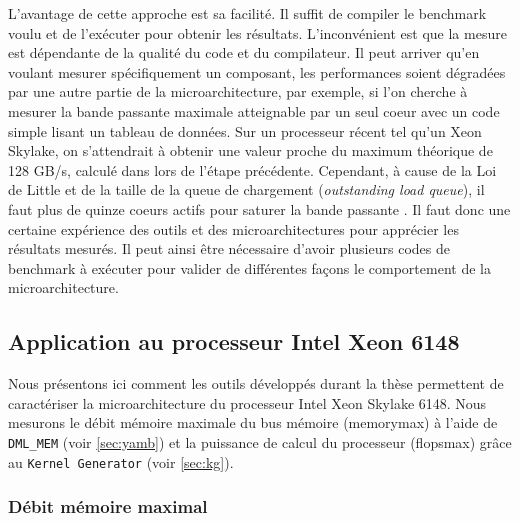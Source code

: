         L'avantage de cette approche est sa facilité. Il suffit de compiler le benchmark voulu et de l'exécuter pour obtenir les résultats. L'inconvénient est que la mesure est dépendante de la qualité du code et du compilateur. Il peut arriver qu'en voulant mesurer spécifiquement un composant, les performances soient dégradées par une autre partie de la microarchitecture, par exemple, si l'on cherche à mesurer la bande passante maximale atteignable par un seul coeur avec un code simple lisant un tableau de données. Sur un processeur récent tel qu'un Xeon Skylake, on s'attendrait à obtenir une valeur proche du maximum théorique de 128 GB/s, calculé dans lors de l'étape précédente. Cependant, à cause de la Loi de Little \cite{little2008little} et de la taille de la queue de chargement (\textit{outstanding load queue}), il faut plus de quinze coeurs actifs pour saturer la bande passante \cite{JohnMcCalpin2010}. Il faut donc une certaine expérience des outils et des microarchitectures pour apprécier les résultats mesurés. Il peut ainsi être nécessaire d'avoir plusieurs codes de benchmark à exécuter pour valider de différentes façons le comportement de la microarchitecture.
        


  
\subsection{Application au processeur Intel Xeon 6148}
    
    Nous présentons ici comment les outils développés durant la thèse permettent de caractériser la microarchitecture du processeur Intel Xeon Skylake 6148. Nous mesurons le débit mémoire maximale du bus mémoire (\gls{memorymax}) à l'aide de \verb=DML_MEM= (voir \autoref{sec:yamb}) et la puissance de calcul du processeur (\gls{flopsmax}) grâce au \verb=Kernel Generator= (voir \autoref{sec:kg}).


    \subsubsection{Débit mémoire maximal}
        
